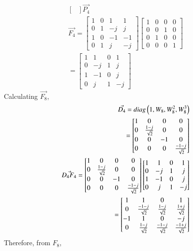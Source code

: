 \documentclass[journal,12pt,twocolumn]{IEEEtran}
\renewcommand\thesection{\arabic{section}}
\begin{document}
\begin{enumerate}[label=\arabic*.,ref=\thesection.\theenumi]
\begin{solution}
\begin{align}
\begin{bmatrix}
\end{bmatrix}\vec{P_4}\\
\vec{F_4}=\begin{bmatrix}
1&0&1&1\\0&1&-j&j\\1&0&-1&-1\\0&1&j&-j
\end{bmatrix}\begin{bmatrix}
1&0&0&0\\0&0&1&0\\0&1&0&0\\0&0&0&1
\end{bmatrix}\\
=\begin{bmatrix}
1&1&0&1\\0&-j&1&j\\1&-1&0&j\\0&j&1&-j
\end{bmatrix}
\end{align}
Calculating $\vec{F_8}$,
\begin{align}
\vec{D_4}=diag\left(1,W_8,W_8^2,W_8^3\right)\\
=\begin{bmatrix}
1&0&0&0\\0&\frac{1-j}{\sqrt{2}}&0&0\\0&0&-1&0\\0&0&0&\frac{-1-j}{\sqrt{2}}
\end{bmatrix}\\
\vec{D_4F_4}=\begin{bmatrix}
1&0&0&0\\0&\frac{1-j}{\sqrt{2}}&0&0\\0&0&-1&0\\0&0&0&\frac{-1-j}{\sqrt{2}}
\end{bmatrix}\begin{bmatrix}
1&1&0&1\\0&-j&1&j\\1&-1&0&j\\0&j&1&-j
\end{bmatrix}\\
=\begin{bmatrix}
1&1&0&1\\0&\frac{-1-j}{\sqrt{2}}&\frac{1-j}{\sqrt{2}}&\frac{1+j}{\sqrt{2}}\\-1&1&0&-j\\0&\frac{1-j}{\sqrt{2}}&\frac{-1-j}{\sqrt{2}}&\frac{-1+j}{\sqrt{2}}
\end{bmatrix}
\end{align}
Therefore, from $F_8$,

\end{solution}
\end{enumerate}
\end{document}
